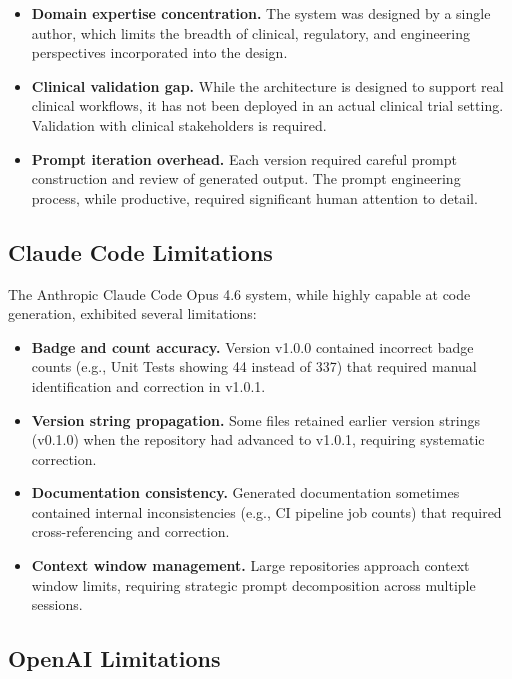 \documentclass{article}
\begin{document}
\begin{itemize}[leftmargin=*]
\item \textbf{Domain expertise concentration.} The system was designed by a single author, which limits the breadth of clinical, regulatory, and engineering perspectives incorporated into the design.
\item \textbf{Clinical validation gap.} While the architecture is designed to support real clinical workflows, it has not been deployed in an actual clinical trial setting. Validation with clinical stakeholders is required.
\item \textbf{Prompt iteration overhead.} Each version required careful prompt construction and review of generated output. The prompt engineering process, while productive, required significant human attention to detail.
\end{itemize}

\subsection{Claude Code Limitations}

The Anthropic Claude Code Opus 4.6 system, while highly capable at code generation, exhibited several limitations:

\begin{itemize}[leftmargin=*]
\item \textbf{Badge and count accuracy.} Version v1.0.0 contained incorrect badge counts (e.g., Unit Tests showing 44 instead of 337) that required manual identification and correction in v1.0.1.
\item \textbf{Version string propagation.} Some files retained earlier version strings (v0.1.0) when the repository had advanced to v1.0.1, requiring systematic correction.
\item \textbf{Documentation consistency.} Generated documentation sometimes contained internal inconsistencies (e.g., CI pipeline job counts) that required cross-referencing and correction.
\item \textbf{Context window management.} Large repositories approach context window limits, requiring strategic prompt decomposition across multiple sessions.
\end{itemize}

\subsection{OpenAI Limitations}
\end{document}
